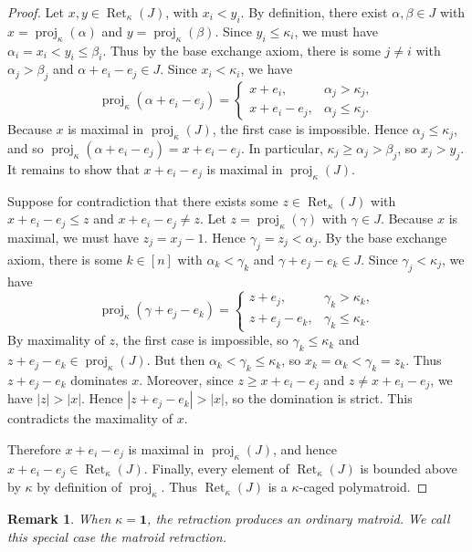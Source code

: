 \documentclass[10pt,a4paper]{amsart}
\newtheorem{remark}[theorem]{Remark}
\newcommand{\ones}{\textbf{1}}
\DeclareMathOperator{\proj}{proj}              %
\newcommand{\kproj}{\proj_{\kappa}}            %
\DeclareMathOperator{\Ret}{Ret}                %
\newcommand{\RetK}{\Ret_{\kappa}}              %
\begin{document}
\begin{proof}
    Let $x,y \in \RetK(J)$, with $x_i < y_i$. By definition, there exist $\alpha,\beta \in J$ with $x = \kproj(\alpha)$ and $y = \kproj(\beta)$. Since $y_i \leq \kappa_i$, we must have $\alpha_i = x_i < y_i \leq \beta_i$. Thus by the base exchange axiom, there is some $j \neq i$ with $\alpha_j > \beta_j$ and $\alpha + e_i - e_j \in J$. Since $x_i < \kappa_i$, we have
    \[
        \kproj(\alpha + e_i - e_j)
        =
        \begin{cases}
            x + e_i, & \alpha_j > \kappa_j, \\
            x + e_i - e_j, & \alpha_j \leq \kappa_j.
        \end{cases}
    \]
    Because $x$ is maximal in $\kproj(J)$, the first case is impossible. Hence $\alpha_j \leq \kappa_j$, and so $\kproj(\alpha + e_i - e_j)=x+e_i-e_j$. In particular, $\kappa_j \geq \alpha_j > \beta_j$, so $x_j > y_j$. It remains to show that $x + e_i - e_j$ is maximal in $\kproj(J)$.

    Suppose for contradiction that there exists some $z \in \RetK(J)$ with $x+e_i-e_j \leq z$ and $x+e_i-e_j \neq z$. Let $z = \kproj(\gamma)$ with $\gamma \in J$. Because $x$ is maximal, we must have $z_j = x_j - 1$. Hence $\gamma_j = z_j < \alpha_j$. By the base exchange axiom, there is some $k \in [n]$ with $\alpha_k < \gamma_k$ and $\gamma + e_j - e_k \in J$. Since $\gamma_j < \kappa_j$, we have
    \[
        \kproj(\gamma + e_j - e_k)
        =
        \begin{cases}
            z + e_j, & \gamma_k > \kappa_k, \\
            z + e_j - e_k, & \gamma_k \leq \kappa_k.
        \end{cases}
    \]
    By maximality of $z$, the first case is impossible, so $\gamma_k \leq \kappa_k$ and $z+e_j-e_k \in \kproj(J)$. But then $\alpha_k < \gamma_k \leq \kappa_k$, so $x_k=\alpha_k<\gamma_k=z_k$. Thus $z+e_j-e_k$ dominates $x$. Moreover, since $z \geq x+e_i-e_j$ and $z\neq x+e_i-e_j$, we have $|z|>|x|$. Hence $|z+e_j-e_k|>|x|$, so the domination is strict. This contradicts the maximality of $x$.

    Therefore $x+e_i-e_j$ is maximal in $\kproj(J)$, and hence $x+e_i-e_j \in \RetK(J)$. Finally, every element of $\RetK(J)$ is bounded above by $\kappa$ by definition of $\kproj$. Thus $\RetK(J)$ is a $\kappa$-caged polymatroid.
\end{proof}
\begin{remark}
    When $\kappa=\ones$, the retraction produces an ordinary matroid. We call this special case the \emph{matroid retraction}.
\end{remark}
\end{document}
